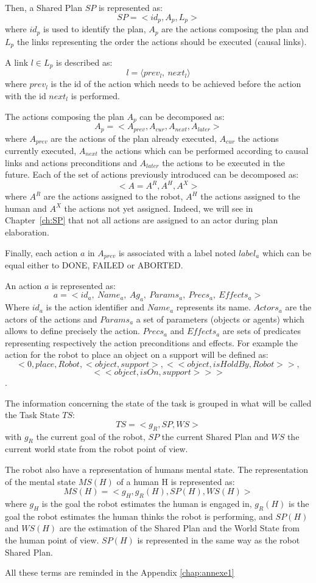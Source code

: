 \documentclass[english,a4paper,11pt,twoside]{StyleThese}
\begin{document}
\bigskip
Then, a Shared Plan $SP$ is represented as:
$$SP = <id_p, A_p, L_p>$$
where $id_p$ is used to identify the plan, $A_p$ are the actions composing the plan and $L_p$ the links representing the order the actions should be executed (causal links).

\bigskip
A link $l \in L_p$ is described as:
 $$l = \langle prev_l, \ next_l \rangle$$
where $prev_l$ is the id of the action which needs to be achieved before the action with the id $next_l$ is performed. 

\bigskip
The actions composing the plan $A_p$ can be decomposed as:
$$A_p = <A_{prev}, A_{cur}, A_{next}, A_{later}>$$
where $A_{prev}$ are the actions of the plan already executed, $A_{cur}$ the actions currently executed, $A_{next}$ the actions which can be performed according to causal links and actions preconditions and $A_{later}$ the actions to be executed in the future.
Each of the set of actions previously introduced can be decomposed as:
$$<A = A^R, A^H, A^X>$$
where $A^R$ are the actions assigned to the robot, $A^H$ the actions assigned to the human and $A^X$ the actions not yet assigned. Indeed, we will see in Chapter~\ref{ch:SP} that not all actions are assigned to an actor during plan elaboration.

Finally, each action $a$ in $A_{prev}$ is associated with a label noted $label_a$ which can be equal either to DONE, FAILED or ABORTED.

\bigskip
An action $a$ is represented as: 
$$a = < id_{a}, \ Name_{a}, \ Ag_{a}, \ Params_{a}, \ Precs_{a}, \ Effects_{a} >$$
Where $id_{a}$ is the action identifier and $Name_{a}$ represents its name. $Actors_{a}$ are the actors of the actions and $Params_{a}$ a set of parameters (objects or agents) which allows to define precisely the action. $Precs_{a}$ and $Effects_{a}$ are sets of predicates representing respectively the action preconditions and effects.
For example the action for the robot to place an object on a support will be defined as:$$<0, place, Robot, <object, support>, <<object, isHoldBy, Robot>>,$$
$$<<object, isOn, support>>>$$.

\bigskip
The information concerning the state of the task is grouped in what will be called the Task State $TS$:
$$TS = <g_R, SP, WS>$$
with $g_R$ the current goal of the robot, $SP$ the current Shared Plan and $WS$ the current world state from the robot point of view.

\bigskip
The robot also have a representation of humans mental state. The representation of the mental state $MS(H)$ of a human H is represented as:
$$MS(H) = <g_H, g_R(H), SP(H), WS(H)>$$
where $g_H$ is the goal the robot estimates the human is engaged in, $g_R(H)$ is the goal the robot estimates the human thinks the robot is performing, and $SP(H)$ and $WS(H)$ are the estimation of the Shared Plan and the World State from the human point of view.
$SP(H)$ is represented in the same way as the robot Shared Plan.

All these terms are reminded in the Appendix \ref{chap:annexe1}


\ifdefined{}
\else


\end{document}
